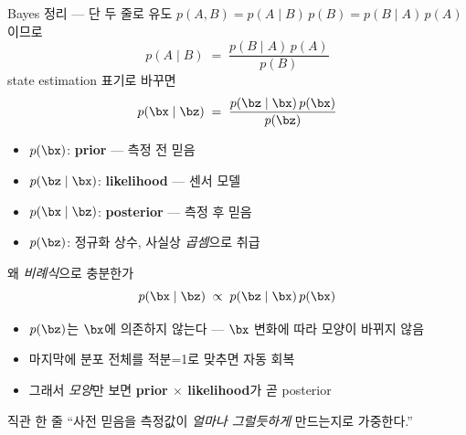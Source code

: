 \begin{frame}{Bayes 정리 — 단 두 줄로 유도}
  $p(A,B) = p(A \mid B)\, p(B) = p(B \mid A)\, p(A)$ 이므로
  \[
    \boxed{\;p(A \mid B) \;=\; \frac{p(B \mid A)\, p(A)}{p(B)}\;}
  \]
  \pause
  \vspace{0.4em}
  state estimation 표기로 바꾸면
  \[
    p(\bx \mid \bz) \;=\; \frac{p(\bz \mid \bx)\, p(\bx)}{p(\bz)}
  \]
  \begin{itemize}
    \item $p(\bx)$: \textbf{prior} — 측정 전 믿음
    \item $p(\bz \mid \bx)$: \textbf{likelihood} — 센서 모델
    \item $p(\bx \mid \bz)$: \textbf{posterior} — 측정 후 믿음
    \item $p(\bz)$: 정규화 상수, 사실상 \emph{곱셈}으로 취급
  \end{itemize}
\end{frame}

\begin{frame}{왜 \emph{비례식}으로 충분한가}
  \[
    p(\bx \mid \bz) \;\propto\; p(\bz \mid \bx)\, p(\bx)
  \]
  \begin{itemize}
    \item $p(\bz)$는 $\bx$에 의존하지 않는다 — $\bx$ 변화에 따라 모양이 바뀌지 않음
    \item 마지막에 분포 전체를 적분=1로 맞추면 자동 회복
    \item 그래서 \emph{모양}만 보면 \textbf{prior $\times$ likelihood}가 곧 posterior
  \end{itemize}
  \pause
  \vspace{0.3em}
  \begin{block}{직관 한 줄}
    ``사전 믿음을 측정값이 \emph{얼마나 그럴듯하게} 만드는지로 가중한다.''
  \end{block}
\end{frame}

